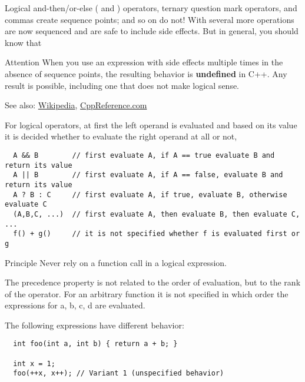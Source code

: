 {Logical and-then/or-else (\cpp{&&} and \cpp{||}) operators, ternary  question mark operators, and commas \cpp{,} create sequence points; \cpp{+, -, <<} and so on do not!
With \marginpar{[\cxx{17}]} several more operations are now sequenced and are safe to include side effects. But in general, you should know that

\begin{guideline}{Attention}
  When you use an expression with side effects multiple times in the absence of sequence points, the resulting behavior is \textbf{undefined} in C++. Any result is possible, including one that does not make logical sense.
\end{guideline}

See also: \href{http://en.wikipedia.org/wiki/Sequence_point}{Wikipedia}, \href{http://en.cppreference.com/w/cpp/language/eval_order}{CppReference.com}

For logical operators, at first the left operand is evaluated and based on its value it is decided whether to evaluate the right operand at all or not, \ie
\begin{verbatim}
  A && B        // first evaluate A, if A == true evaluate B and return its value
  A || B        // first evaluate A, if A == false, evaluate B and return its value
  A ? B : C     // first evaluate A, if true, evaluate B, otherwise evaluate C
  (A,B,C, ...)  // first evaluate A, then evaluate B, then evaluate C, ...
  f() + g()     // it is not specified whether f is evaluated first or g
\end{verbatim}

\begin{guideline}{Principle}
  Never rely on a function call in a logical expression.
\end{guideline}

\begin{rem}
  The precedence property is not related to the order of evaluation, but to the rank of the operator. For an arbitrary function  it
  is not specified in which order the expressions for a, b, c, d are evaluated.
\end{rem}

\begin{example}
  The following expressions have different behavior:
  \begin{verbatim}
  int foo(int a, int b) { return a + b; }

  int x = 1;
  foo(++x, x++); // Variant 1 (unspecified behavior)


\end{verbatim}
\end{example}}
